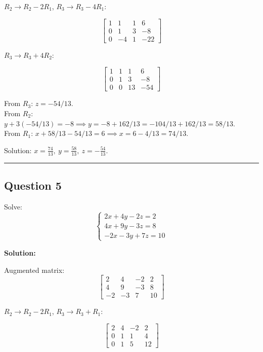 \documentclass[
  letterpaper,
  DIV=11,
  numbers=noendperiod]{scrreprt}
\begin{document}
\(R_2 \rightarrow R_2 - 2R_1\), \(R_3 \rightarrow R_3 - 4R_1\):

\[
\begin{bmatrix}
1 & 1 & 1 & 6 \\
0 & 1 & 3 & -8 \\
0 & -4 & 1 & -22
\end{bmatrix}
\]

\(R_3 \rightarrow R_3 + 4R_2\):

\[
\begin{bmatrix}
1 & 1 & 1 & 6 \\
0 & 1 & 3 & -8 \\
0 & 0 & 13 & -54
\end{bmatrix}
\]

From \(R_3\): \(z = -54/13\).\\
From \(R_2\):
\(y + 3(-54/13) = -8 \implies y = -8 + 162/13 = -104/13 + 162/13 = 58/13\).\\
From \(R_1\): \(x + 58/13 - 54/13 = 6 \implies x = 6 - 4/13 = 74/13\).

Solution:
\(\boxed{x=\frac{74}{13},\ y=\frac{58}{13},\ z=-\frac{54}{13}}\).

\begin{center}\rule{0.5\linewidth}{0.5pt}\end{center}

\subsection{Question 5}\label{question-5}

Solve: \[
\begin{cases}
2x + 4y - 2z = 2 \\
4x + 9y - 3z = 8 \\
-2x - 3y + 7z = 10
\end{cases}
\]

\textbf{Solution:}

Augmented matrix: \[
\begin{bmatrix}
2 & 4 & -2 & 2 \\
4 & 9 & -3 & 8 \\
-2 & -3 & 7 & 10
\end{bmatrix}
\]

\(R_2 \rightarrow R_2 - 2R_1\), \(R_3 \rightarrow R_3 + R_1\):

\[
\begin{bmatrix}
2 & 4 & -2 & 2 \\
0 & 1 & 1 & 4 \\
0 & 1 & 5 & 12
\end{bmatrix}
\]
\end{document}
